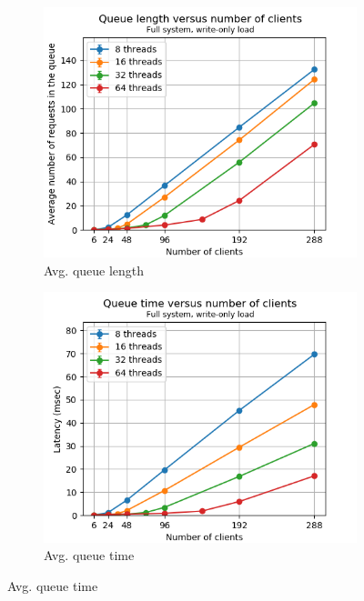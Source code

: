 \documentclass[11pt,a4paper]{article}
\begin{document}
\begin{figure}[h]
\centering
\begin{subfigure}{.33\textwidth}
  \centering
  \includegraphics[width=1.0\linewidth,trim={0px 0px 0px 0px},clip]{img/plot/tpfw-qlen_mw.png}
  \caption{Avg. queue length}
  \label{fig:tpfw-qlen_mw}
\end{subfigure}%
\begin{subfigure}{.33\textwidth}
  \centering
  \includegraphics[width=1.0\linewidth,trim={0px 0px 0px 0px},clip]{img/plot/tpfw-qtime_mw.png}
  \caption{Avg. queue time}
  \label{fig:tpfw-qtime_mw}
\end{subfigure}%

\end{figure}
\end{document}
